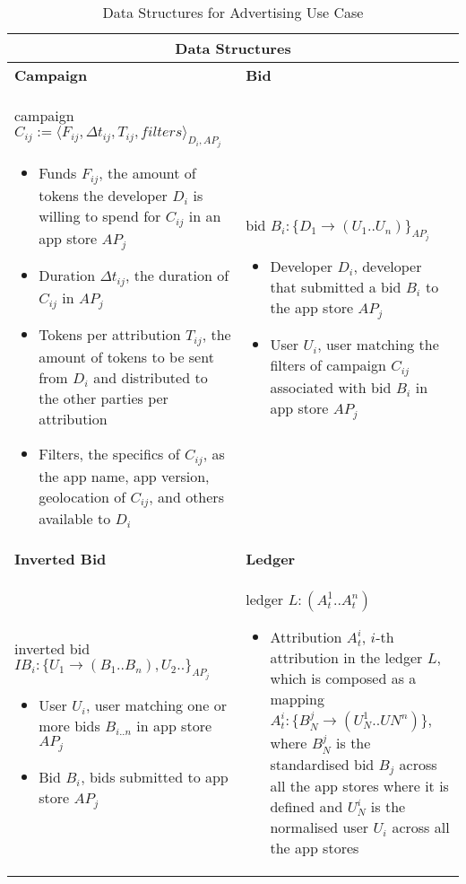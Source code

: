\begin{table}[H]
\footnotesize
\centering
\begin{tabular}{|p{}p{}|}
\hline
\multicolumn{2}{|c|}{Data Structures} \\
\hline \vspace{0.05cm}
\textbf{Campaign} & \vspace{0.05cm} \textbf{Bid} \\
campaign $C_{ij} := \langle F_{ij}, \Delta t_{ij}, T_{ij}, filters \rangle_{D_{i}, AP_{j}}$
\begin{itemize}
	\item Funds $F_{ij}$, the amount of tokens the developer $D_{i}$ is willing to spend for $C_{ij}$ in an app store $AP_{j}$
	\item Duration $\Delta t_{ij}$, the duration of $C_{ij}$ in $AP_{j}$
	\item Tokens per attribution $T_{ij}$, the amount of tokens to be sent from $D_{i}$ and distributed to the other parties per attribution
	\item Filters, the specifics of $C_{ij}$, as the app name, app version, geolocation of $C_{ij}$, and others available to $D_{i}$
\end{itemize}
& bid $B_i : \{D_1 \to (U_1..U_n)\}_{AP_j}$
\begin{itemize}
	\item Developer $D_i$, developer that submitted a bid $B_i$ to the app store $AP_j$ 
	\item User $U_i$, user matching the filters of campaign $C_{ij}$ associated with bid $B_i$ in app store $AP_j$
\end{itemize} \\
\textbf{Inverted Bid} & \textbf{Ledger} \\
inverted bid $IB_i : \{U_1 \to (B_1..B_n), U_2..\}_{AP_j}$
\begin{itemize}
	\item User $U_i$, user matching one or more bids $B_{i..n}$ in app store $AP_j$
	\item Bid $B_i$, bids submitted to app store $AP_j$
\end{itemize}
& ledger $L : (A^{1}_{t}..A^{n}_{t})$
\begin{itemize}
	\item Attribution $A^{i}_{t}$, $i$-th attribution in the ledger $L$, which is composed as a mapping $A^{i}_{t} : \{B_{N}^{j} \to (U_{N}^{1}..U{N}^{n})\}$, where $B_{N}^{j}$ is the standardised bid $B_j$ across all the app stores where it is defined and $U_{N}^{i}$ is the normalised user $U_i$ across all the app stores
\end{itemize} \\
\hline
\end{tabular}
\caption{Data Structures for Advertising Use Case}
\label{table: data_structures_ad}
\end{table}




